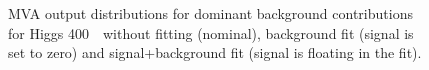 \begin{figure}[!hbtp]
\caption{
MVA output distributions for dominant background contributions for
Higgs 400~\GeV\ without fitting (nominal), background fit (signal is
set to zero) and signal+background fit (signal is floating in the
fit).}
\label{fig:bdt2_400}
\end{figure}

